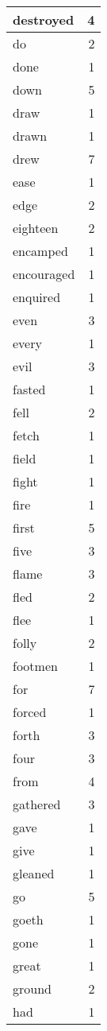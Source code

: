 \begin{center}
\begin{longtable}{l|r}
destroyed & 4 \\ \hline
do & 2 \\ \hline
done & 1 \\ \hline
down & 5 \\ \hline
draw & 1 \\ \hline
drawn & 1 \\ \hline
drew & 7 \\ \hline
ease & 1 \\ \hline
edge & 2 \\ \hline
eighteen & 2 \\ \hline
encamped & 1 \\ \hline
encouraged & 1 \\ \hline
enquired & 1 \\ \hline
even & 3 \\ \hline
every & 1 \\ \hline
evil & 3 \\ \hline
fasted & 1 \\ \hline
fell & 2 \\ \hline
fetch & 1 \\ \hline
field & 1 \\ \hline
fight & 1 \\ \hline
fire & 1 \\ \hline
first & 5 \\ \hline
five & 3 \\ \hline
flame & 3 \\ \hline
fled & 2 \\ \hline
flee & 1 \\ \hline
folly & 2 \\ \hline
footmen & 1 \\ \hline
for & 7 \\ \hline
forced & 1 \\ \hline
forth & 3 \\ \hline
four & 3 \\ \hline
from & 4 \\ \hline
gathered & 3 \\ \hline
gave & 1 \\ \hline
give & 1 \\ \hline
gleaned & 1 \\ \hline
go & 5 \\ \hline
goeth & 1 \\ \hline
gone & 1 \\ \hline
great & 1 \\ \hline
ground & 2 \\ \hline
had & 1 \\ \hline

\end{longtable}
\end{center}
